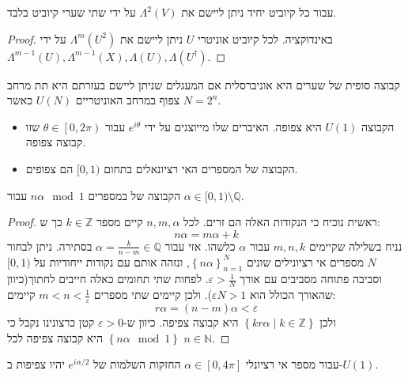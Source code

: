 \documentclass{tstextbook}
\begin{document}
\begin{proposition}
עבור כל קיוביט יחיד ניתן ליישם את \(\Lambda^{2}(V)\) על ידי שתי שערי קיוביט בלבד.

\end{proposition}
\begin{proof}
באינדוקציה. לכל קיוביט אוניטרי \(U\) ניתן ליישם את \(\Lambda^{m}(U^{2})\) על ידי \(\Lambda^{m-1}(U),\Lambda^{m-1}(X),\Lambda(U),\Lambda\left( U^{\dagger} \right)\).

\end{proof}
\begin{definition}
קבוצה סופית של שערים היא אוניברסלית אם המעגלים שניתן ליישם בעזרתם היא תת מרחב צפוף במרחב האוניטריים \(U(N)\) כאשר \(N=2^{n}\).

\end{definition}
\begin{example}
  \begin{itemize}
    \item הקבוצה \(U(1)\) היא צפופה. האיברים שלו מייוצגים על ידי \(e^{ i\theta }\) עבור \(\theta \in \left[ 0,2\pi \right)\) שזו קבוצה צפופה.
    \item הקבוצה של המספרים האי רציונאלים בתחום \([0,1)\) הם צפופים.
  \end{itemize}
\end{example}
\begin{proposition}
הקבוצה של במספרים \(n\alpha \mod 1\) עבור \(\alpha \in [0,1) \setminus \mathbb{Q}\).

\end{proposition}
\begin{proof}
ראשית נוכיח כי הנקודות האלה הם זרים. לכל \(n,m,\alpha\) קיים מספר \(k \in \mathbb{Z}\) כך ש:
$$n\alpha = m\alpha+k$$
נניח בשלילה שקיימים \(m,n,k\) עבור \(\alpha\) כלשהו. אזי עבור \(\alpha = \frac{k}{n-m}\in \mathbb{Q}\) בסתירה.
ניתן לבחור \(N\) מספרים אי רציונילים שונים \(\left\{  n\alpha  \right\}_{n=1}^{N}\), ונזהה אותם עם נקודות ייחודיות על \([0,1)\) וסביבה פתוחה מסביבים עם אורך \(\varepsilon> \frac{1}{N}\). 
לפחות שתי תחומים כאלה חייבים לחתוך(כיוון שהאורך הכולל הוא \(\varepsilon N > 1\)). ולכן קיימים שתי מספרים \(m<n< \frac{1}{\varepsilon}\) קיימים:
$$r\alpha=(n-m)\alpha<\varepsilon$$
ולכן \(\left\{  kr\alpha \mid k \in \mathbb{Z}  \right\}\) היא קבוצה צפיפה. כיוון ש-\(\varepsilon> 0\) קטן כרצונינו נקבל כי \(\left\{  n\alpha \mod 1  \right\}\) היא קבוצה צפיפה לכל \(n \in \mathbb{N}\).

\end{proof}
\begin{corollary}
עבור מספר אי רציונלי \(\alpha \in \left[ 0,4\pi \right]\) החזקות השלמות של \(e^{ i\alpha/2 }\) יהיו צפיפות ב-\(U(1)\).

\end{corollary}
\end{document}
